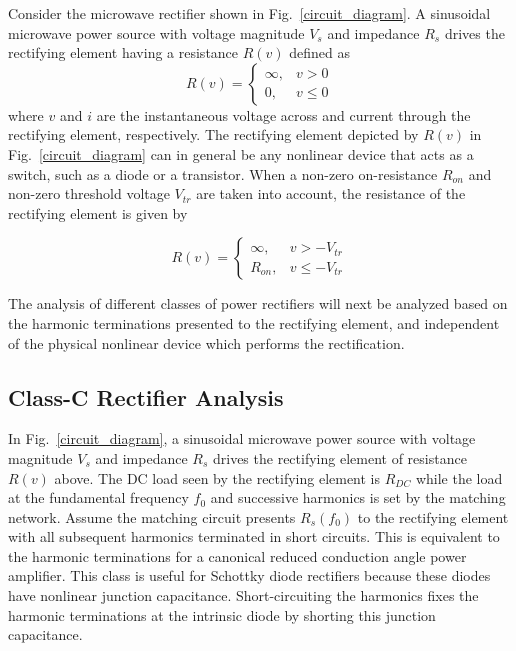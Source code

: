 Consider the microwave rectifier shown in Fig.~\ref{circuit_diagram}.  A sinusoidal microwave power source with voltage magnitude $V_s$ and impedance $R_s$ drives the rectifying element having a resistance $R(v)$ defined as
\begin{equation}\label{ideal_rectifier_resistance}
R(v) =
\begin{cases}
    \infty, & v > 0\\
    0, & v \leq 0
\end{cases}
\end{equation}
where $v$ and $i$ are the instantaneous voltage across and current through the rectifying element, respectively. The rectifying element depicted by $R(v)$ in Fig.~\ref{circuit_diagram} can in general be any nonlinear device that acts as a switch, such as a diode or a transistor. When a non-zero on-resistance $R_{on}$ and non-zero threshold voltage $V_{tr}$ are taken into account, the resistance of the rectifying element is given by

\begin{equation}\label{nonideal_rectifier_resistance}
R(v) =
\begin{cases}
    \infty, & v > -V_{tr}\\
    R_{on}, & v \leq -V_{tr}
\end{cases}
\end{equation}

The analysis of different classes of power rectifiers will next be analyzed based on the harmonic terminations presented to the rectifying element, and independent of the physical nonlinear device which performs the rectification.









\subsection {Class-C Rectifier Analysis}

In Fig.~\ref{circuit_diagram}, a sinusoidal microwave power source with voltage magnitude $V_s$ and impedance $R_s$ drives the rectifying element of resistance $R(v)$ above. The DC load seen by the rectifying element is $R_{DC}$ while the load at the fundamental frequency $f_0$ and successive harmonics is set by the matching network. Assume the matching circuit presents $R_s(f_0)$ to the rectifying element with all subsequent harmonics terminated in short circuits. This is equivalent to the harmonic terminations for a canonical reduced conduction angle power amplifier. This class is useful for Schottky diode rectifiers because these diodes have nonlinear junction capacitance. Short-circuiting the harmonics fixes the harmonic terminations at the intrinsic diode by shorting this junction capacitance.

